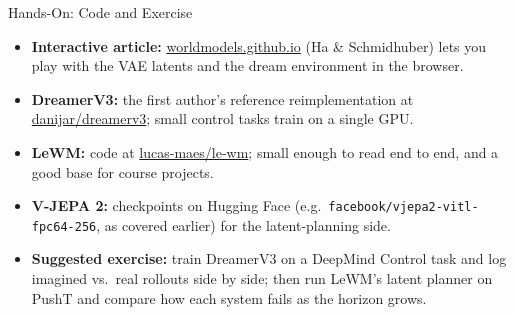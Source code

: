 \begin{frame}{Hands-On: Code and Exercise}
  \begin{itemize}\itemsep0.3em
    \item[\textcolor{red}{$\blacktriangleright$}] \textbf{Interactive article:} \href{https://worldmodels.github.io/}{worldmodels.github.io} (Ha \& Schmidhuber) lets you play with the VAE latents and the dream environment in the browser.
    \item[\textcolor{red}{$\blacktriangleright$}] \textbf{DreamerV3:} the first author's reference reimplementation at \href{https://github.com/danijar/dreamerv3}{danijar/dreamerv3}; small control tasks train on a single GPU.
    \item[\textcolor{red}{$\blacktriangleright$}] \textbf{LeWM:} code at \href{https://github.com/lucas-maes/le-wm}{lucas-maes/le-wm}; small enough to read end to end, and a good base for course projects.
    \item[\textcolor{red}{$\blacktriangleright$}] \textbf{V-JEPA 2:} checkpoints on Hugging Face (e.g.\ \texttt{facebook/vjepa2-vitl-fpc64-256}, as covered earlier) for the latent-planning side.
    \item[\textcolor{red}{$\blacktriangleright$}] \textbf{Suggested exercise:} train DreamerV3 on a DeepMind Control task and log imagined vs.\ real rollouts side by side; then run LeWM's latent planner on PushT and compare how each system fails as the horizon grows.
  \end{itemize}
\end{frame}
